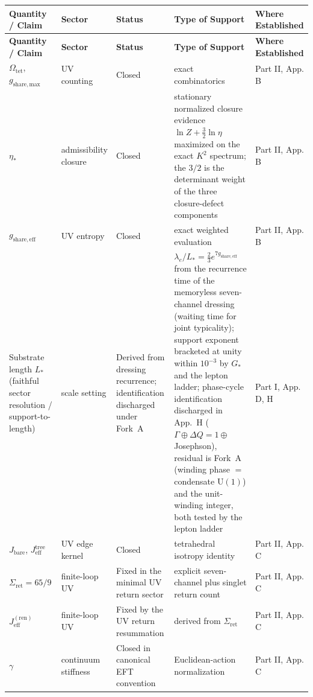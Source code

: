 \documentclass[11pt]{article}
\begin{document}
\begingroup
\scriptsize
\setlength{\tabcolsep}{3pt}
\renewcommand{\arraystretch}{1.12}
\begin{longtable}{|L{0.18\textwidth}|L{0.13\textwidth}|L{0.16\textwidth}|L{0.33\textwidth}|L{0.13\textwidth}|}
\hline
\textbf{Quantity / Claim} & \textbf{Sector} & \textbf{Status} & \textbf{Type of Support} & \textbf{Where Established} \\
\hline
\endfirsthead
\hline
\textbf{Quantity / Claim} & \textbf{Sector} & \textbf{Status} & \textbf{Type of Support} & \textbf{Where Established} \\
\hline
\endhead
$\Omega_{\mathrm{tet}}$, $g_{\mathrm{share,max}}$ & UV counting & Closed & exact combinatorics & Part II, App. B \\
\hline
$\eta_*$ & admissibility closure & Closed & stationary normalized closure evidence $\ln Z+\tfrac32\ln\eta$ maximized on the exact $K^2$ spectrum; the $3/2$ is the determinant weight of the three closure-defect components & Part II, App. B \\
\hline
$g_{\mathrm{share,eff}}$ & UV entropy & Closed & exact weighted evaluation & Part II, App. B \\
\hline
Substrate length $L_*$ (faithful sector resolution / support-to-length) & scale setting & Derived from dressing recurrence; identification discharged under Fork~A & $\lambda_e/L_*=\tfrac23 e^{7g_{\mathrm{share,eff}}}$ from the recurrence time of the memoryless seven-channel dressing (waiting time for joint typicality); support exponent bracketed at unity within $10^{-3}$ by $G_*$ and the lepton ladder; phase-cycle identification discharged in App.~H ($\Gamma\oplus\Delta Q{=}1\oplus$ Josephson), residual is Fork~A (winding phase $=$ condensate $\mathrm{U}(1)$) and the unit-winding integer, both tested by the lepton ladder & Part I, App. D, H \\
\hline
$J_{\mathrm{bare}}$, $J_{\mathrm{eff}}^{\mathrm{tree}}$ & UV edge kernel & Closed & tetrahedral isotropy identity & Part II, App. C \\
\hline
$\Sigma_{\mathrm{ret}}=65/9$ & finite-loop UV & Fixed in the minimal UV return sector & explicit seven-channel plus singlet return count & Part II, App. C \\
\hline
$J_{\mathrm{eff}}^{(\mathrm{ren})}$ & finite-loop UV & Fixed by the UV return resummation & derived from $\Sigma_{\mathrm{ret}}$ & Part II, App. C \\
\hline
$\gamma$ & continuum stiffness & Closed in canonical EFT convention & Euclidean-action normalization & Part II, App. C \\

\end{longtable}
\end{document}
